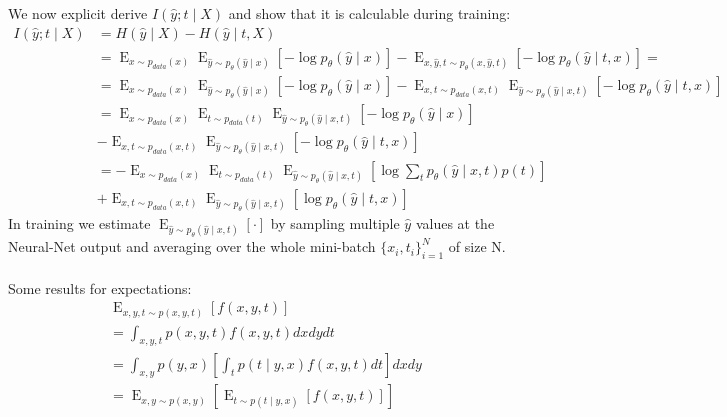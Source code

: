 \documentclass[oneside,12pt]{article}
\begin{document}
We now explicit derive $I(\hat{y};t \mid X)$ and show that it is calculable during training:
%
\begin{equation}
    \begin{split}
        I(\hat{y};t \mid X) &= H(\hat{y} \mid X) - H(\hat{y} \mid t,X)\\
        &= \operatorname{E}_{x \sim p_{data}(x)} \operatorname{E}_{\hat{y} \sim p_\theta(\hat{y} \mid x)} \left[ -\operatorname{log}p_\theta(\hat{y} \mid x)\right] - \operatorname{E}_{x,\hat{y},t \sim p_\theta(x,\hat{y},t)}  \left[ -\operatorname{log}p_\theta(\hat{y} \mid t,x)\right] =\\
        &= \operatorname{E}_{x \sim p_{data}(x)} \operatorname{E}_{\hat{y} \sim p_\theta(\hat{y} \mid x)} \left[ -\operatorname{log}p_\theta(\hat{y} \mid x)\right] - \operatorname{E}_{x,t \sim p_{data}(x,t)} \operatorname{E}_{\hat{y} \sim p_\theta(\hat{y} \mid x,t)} \left[ -\operatorname{log} p_\theta(\hat{y} \mid t,x) \right]\\
        &= \operatorname{E}_{x \sim p_{data}(x)} \operatorname{E}_{t \sim p_{data}(t)} \operatorname{E}_{\hat{y} \sim p_\theta(\hat{y} \mid x,t)} \left[ -\operatorname{log} p_\theta(\hat{y} \mid x) \right]\\
        &- \operatorname{E}_{x,t \sim p_{data}(x,t)} \operatorname{E}_{\hat{y} \sim p_\theta(\hat{y} \mid x,t)} \left[ -\operatorname{log} p_\theta(\hat{y} \mid t,x) \right]\\
        &= -\operatorname{E}_{x \sim p_{data}(x)} \operatorname{E}_{t \sim p_{data}(t)} \operatorname{E}_{\hat{y} \sim p_\theta(\hat{y} \mid x,t)} \left[ \operatorname{log} \sum_t p_\theta(\hat{y} \mid x, t)p(t) \right]\\
        &+ \operatorname{E}_{x,t \sim p_{data}(x,t)} \operatorname{E}_{\hat{y} \sim p_\theta(\hat{y} \mid x,t)} \left[ \operatorname{log} p_\theta(\hat{y} \mid t,x) \right]
    \end{split}
\end{equation}
In training we estimate $\operatorname{E}_{\hat{y} \sim p_\theta(\hat{y} \mid x,t)} \left[ \cdot \right]$ by sampling multiple $\hat{y}$ values at the Neural-Net output and averaging over the whole mini-batch $\{x_i,t_i\}_{i=1}^N$ of size N.\\\\
%
Some results for expectations:
\begin{equation*}
    \begin{split}
        &\operatorname{E}_{x,y,t \sim p(x,y,t)} \left[ f(x,y,t)\right]\\
        &= \int_{x,y,t}p(x,y,t)f(x,y,t)dxdydt\\
        &= \int_{x,y}p(y,x)\left[ \int_t p(t \mid y,x)f(x,y,t)dt\right]dxdy\\
        &= \operatorname{E}_{x,y \sim p(x,y)} \left[\operatorname{E}_{t \sim p(t \mid y,x)}\left[ f(x,y,t)\right] \right]
    \end{split}
\end{equation*}
\end{document}
